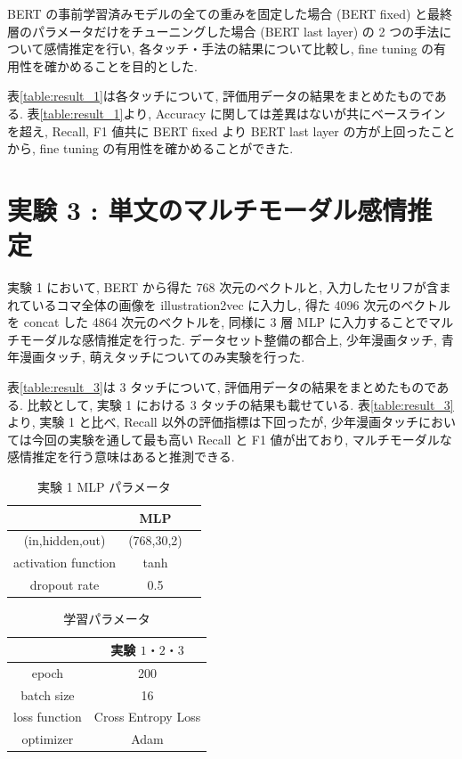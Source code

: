 \documentclass[twocolumn]{jarticle}     %
\begin{document}
BERT の事前学習済みモデルの全ての重みを固定した場合 (BERT fixed) と最終層のパラメータだけをチューニングした場合 (BERT last layer) の 2 つの手法について感情推定を行い, 各タッチ・手法の結果について比較し, fine tuning の有用性を確かめることを目的とした.

表\ref{table:result_1}は各タッチについて, 評価用データの結果をまとめたものである.
表\ref{table:result_1}より, Accuracy に関しては差異はないが共にベースラインを超え, Recall, F1 値共に BERT fixed より BERT last layer の方が上回ったことから, fine tuning の有用性を確かめることができた.

\section{\small{実験 3 : 単文のマルチモーダル感情推定}}
実験 1 において, BERT から得た 768 次元のベクトルと, 入力したセリフが含まれているコマ全体の画像を illustration2vec に入力し, 得た 4096 次元のベクトルを concat した 4864 次元のベクトルを, 同様に 3 層 MLP に入力することでマルチモーダルな感情推定を行った. データセット整備の都合上, 少年漫画タッチ, 青年漫画タッチ, 萌えタッチについてのみ実験を行った.

表\ref{table:result_3}は 3 タッチについて, 評価用データの結果をまとめたものである. 比較として, 実験 1 における 3 タッチの結果も載せている.
表\ref{table:result_3}より, 実験 1 と比べ, Recall 以外の評価指標は下回ったが, 少年漫画タッチにおいては今回の実験を通して最も高い Recall と F1 値が出ており, マルチモーダルな感情推定を行う意味はあると推測できる.


\begin{table}[htb]
\caption{実験 1 MLP パラメータ}
\label{table:mlp_para}
\centering
\begin{tabular}{|c||c|c|}
\hline
& MLP \\ \hline
(in,hidden,out) & (768,30,2) \\ \hline
activation function & tanh \\ \hline
dropout rate & 0.5 \\ \hline
\end{tabular}
\end{table}

\begin{table}[htb]
\caption{学習パラメータ}
\label{table:ex_para}
\centering
\begin{tabular}{|c||c|c|}
\hline
& \multicolumn{2}{|c|}{実験 $1・2・3$} \\ \hline
epoch & \multicolumn{2}{|c|}{200}  \\ \hline
batch size & \multicolumn{2}{|c|}{16} \\ \hline
loss function & \multicolumn{2}{|c|}{Cross Entropy Loss} \\ \hline
optimizer & \multicolumn{2}{|c|}{Adam} \\ \hline
\end{tabular}
\end{table}
\end{document}
